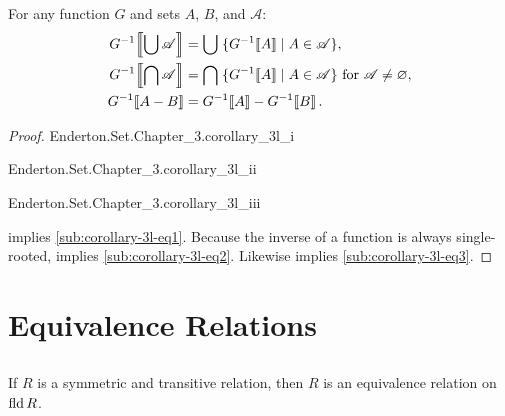 \documentclass{report}
\begin{document}
\begin{theorem}[3L]

  For any function $G$ and sets $A$, $B$, and $\mathscr{A}$:
  \begin{align}
    G^{-1}\!\left\llbracket\bigcup{\mathscr{A}}\right\rrbracket
      & = \bigcup\;\{G^{-1}\!\left\llbracket A\right\rrbracket \mid A \in \mathscr{A}\},
      \label{sub:corollary-3l-eq1} \\
    G^{-1}\!\left\llbracket\bigcap{\mathscr{A}}\right\rrbracket
      & = \bigcap\;\{G^{-1}\!\left\llbracket A\right\rrbracket \mid A \in \mathscr{A}\}
      \text{ for } \mathscr{A} \neq \varnothing,
      \label{sub:corollary-3l-eq2} \\
    G^{-1}\!\left\llbracket A - B\right\rrbracket & = G^{-1}\!\left\llbracket A\right\rrbracket - G^{-1}\!\left\llbracket B\right\rrbracket.
      \label{sub:corollary-3l-eq3}
  \end{align}

\end{theorem}

\begin{proof}

  \statementpadding

    {Enderton.Set.Chapter\_3.corollary\_3l\_i}

    {Enderton.Set.Chapter\_3.corollary\_3l\_ii}

    {Enderton.Set.Chapter\_3.corollary\_3l\_iii}

   implies \eqref{sub:corollary-3l-eq1}.
  Because the inverse of a function is always single-rooted,
     implies \eqref{sub:corollary-3l-eq2}.
  Likewise  implies \eqref{sub:corollary-3l-eq3}.

\end{proof}

\section{Equivalence Relations}%
\label{sec:equivalence-relations}

\subsection{}%
\label{sub:theorem-3m}

\begin{theorem}[3M]

  If $R$ is a symmetric and transitive relation, then $R$ is an equivalence
    relation on $\mathop{\text{fld}}{R}$.

\end{theorem}
\end{document}
